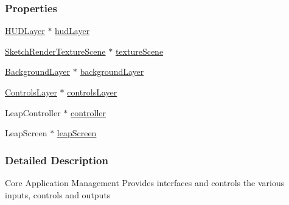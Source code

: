 \subsubsection*{Properties}
\begin{DoxyCompactItemize}
\item 
\hyperlink{interface_h_u_d_layer}{H\-U\-D\-Layer} $\ast$ \hyperlink{interface_game_manager_ae286fb2f9d31810d73c7231a574b56b0}{hud\-Layer}
\item 
\hyperlink{interface_sketch_render_texture_scene}{Sketch\-Render\-Texture\-Scene} $\ast$ \hyperlink{interface_game_manager_a79a86ff991f39b3007d99ca61af21253}{texture\-Scene}
\item 
\hyperlink{interface_background_layer}{Background\-Layer} $\ast$ \hyperlink{interface_game_manager_a2a3a96f1202b13592f244cf1402b4051}{background\-Layer}
\item 
\hyperlink{interface_controls_layer}{Controls\-Layer} $\ast$ \hyperlink{interface_game_manager_a0ee5903be06e4a676ddde4c1f03530a7}{controls\-Layer}
\item 
Leap\-Controller $\ast$ \hyperlink{interface_game_manager_a4b089253ae3569099d28535b128f3436}{controller}
\item 
Leap\-Screen $\ast$ \hyperlink{interface_game_manager_a85cb30e21c987f66855a762c6ba88096}{leap\-Screen}
\end{DoxyCompactItemize}


\subsubsection{Detailed Description}
Core Application Management Provides interfaces and controls the various inputs, controls and outputs 

